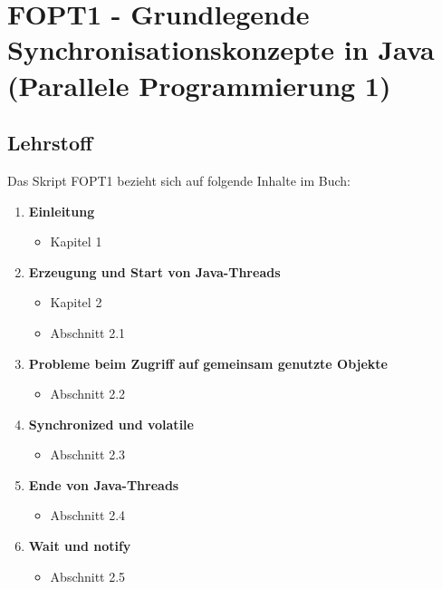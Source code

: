 
\chapter{FOPT1 - Grundlegende Synchronisationskonzepte in Java (Parallele Programmierung 1)}

\section{Lehrstoff}

Das Skript FOPT1 bezieht sich auf folgende Inhalte im Buch:

\begin{tcolorbox}[colback=white!20,color=white]
    \begin{enumerate}
        \item \textbf{Einleitung}
            \begin{itemize}
                \item[] Kapitel 1
            \end{itemize}

        \item \textbf{Erzeugung und Start von Java-Threads}
            \begin{itemize}
                \item[] Kapitel 2
                \item[] Abschnitt 2.1
            \end{itemize}

        \item \textbf{Probleme beim Zugriff auf gemeinsam genutzte Objekte}
        \begin{itemize}
            \item[] Abschnitt 2.2
        \end{itemize}

        \item \textbf{Synchronized und volatile}
        \begin{itemize}
            \item[] Abschnitt 2.3
        \end{itemize}

        \item \textbf{Ende von Java-Threads}
        \begin{itemize}
            \item[] Abschnitt 2.4
        \end{itemize}

        \item \textbf{Wait und notify}
        \begin{itemize}
            \item[] Abschnitt 2.5
        \end{itemize}


\end{enumerate}
\end{tcolorbox}
